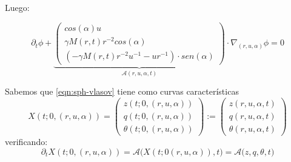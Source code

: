 \documentclass[a4paper,10pt]{scrartcl}
\theoremstyle{definition}
\numberwithin{equation}{section}
\begin{document}
Luego:

\begin{equation}
\label{eqn:sph-vlasov}
\partial_t \phi + \underbrace{
    \left(\begin{array}{c}
        cos(\alpha)u\\
        \gamma M(r,t) r^{-2} cos(\alpha)\\
        (-\gamma M(r,t) r^{-2} u^{-1} - ur^{-1})\cdot sen(\alpha)
    \end{array}\right)}_{\mathcal{A}(r,u,\alpha,t)}
    \cdot \nabla_{(r,u,\alpha)} \phi = 0
\end{equation}

Sabemos que \eqref{eqn:sph-vlasov} tiene como curvas características 
\[
 X(t; 0, (r,u,\alpha)) = 
    \left(\begin{array}{c} 
       z(t; 0, (r, u, \alpha))\\ q(t; 0, (r, u, \alpha))\\ \theta(t; 0, (r, u, \alpha))
    \end{array}\right) :=
    \left(\begin{array}{c} 
       z(r, u, \alpha, t)\\ q(r, u, \alpha, t)\\ \theta(r, u, \alpha, t)
    \end{array}\right)
\]
verificando:
\begin{equation}
\label{eqn:sph-cc}
\partial_t X(t; 0,(r,u,\alpha)) = \mathcal{A}\big(X(t;0(r,u,\alpha)),t\big) = \mathcal{A}\big(z,q,\theta,t\big)
\end{equation}
\end{document}
